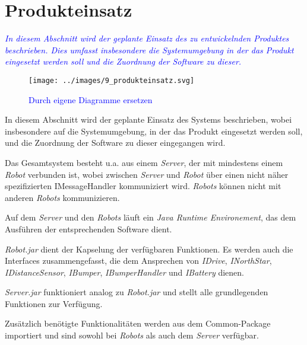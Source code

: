 \section{Produkteinsatz}
\textcolor{blue}{\textit{In diesem Abschnitt wird der geplante Einsatz des zu entwickelnden Produktes beschrieben. Dies umfasst insbesondere die Systemumgebung in der das Produkt eingesetzt werden soll und die Zuordnung der Software zu dieser.
}}

\begin{figure}[H]
\centering
\texttt{[image: ../images/9\_produkteinsatz.svg]}
\caption{\textcolor{blue}{Durch eigene Diagramme ersetzen}}
\label{Produkteinsatz}
\end{figure}

In diesem Abschnitt wird der geplante Einsatz des Systems beschrieben, wobei insbesondere auf die Systemumgebung, in der das Produkt eingesetzt werden soll, und die Zuordnung der Software zu dieser eingegangen wird.

Das Gesamtsystem besteht u.a. aus einem \emph{Server}, der mit mindestens einem \emph{Robot} verbunden ist, wobei zwischen \emph{Server} und \emph{Robot} über einen nicht näher spezifizierten IMessageHandler kommuniziert wird. \emph{Robots} können nicht mit anderen \emph{Robots} kommunizieren.

Auf dem \emph{Server} und den \emph{Robots} läuft ein \emph{Java Runtime Environement}, das dem Ausführen der entsprechenden Software dient.

\emph{Robot.jar} dient der Kapselung der verfügbaren Funktionen. Es werden auch die Interfaces zusammengefasst, die dem Ansprechen von \emph{IDrive}, \emph{INorthStar}, \emph{IDistanceSensor}, \emph{IBumper}, \emph{IBumperHandler} und \emph{IBattery} dienen.

\emph{Server.jar} funktioniert analog zu \emph{Robot.jar} und stellt alle grundlegenden Funktionen zur Verfügung.

Zusätzlich benötigte Funktionalitäten werden aus dem Common-Package importiert und sind sowohl bei \emph{Robots} als auch dem \emph{Server} verfügbar.
